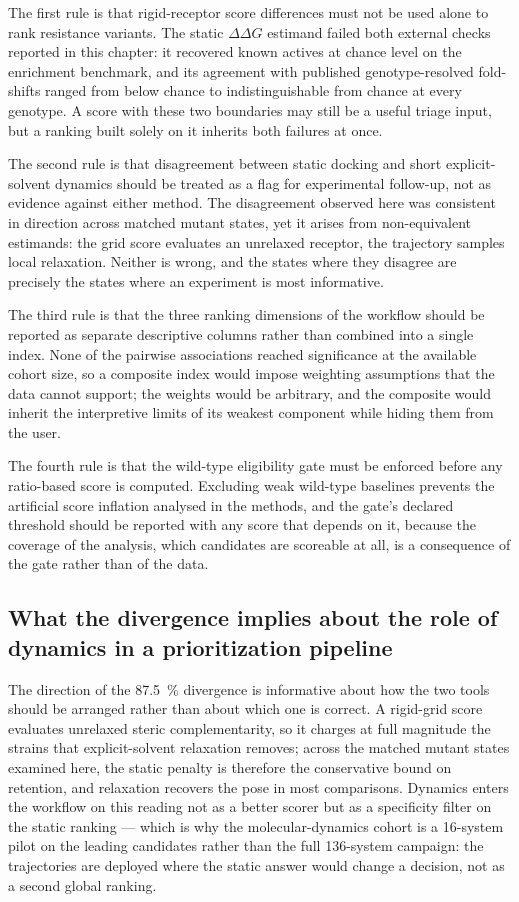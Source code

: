 The first rule is that rigid-receptor score differences must not be used alone to rank resistance variants. The static $\Delta\Delta G$ estimand failed both external checks reported in this chapter: it recovered known actives at chance level on the enrichment benchmark, and its agreement with published genotype-resolved fold-shifts ranged from below chance to indistinguishable from chance at every genotype. A score with these two boundaries may still be a useful triage input, but a ranking built solely on it inherits both failures at once.

The second rule is that disagreement between static docking and short explicit-solvent dynamics should be treated as a flag for experimental follow-up, not as evidence against either method. The disagreement observed here was consistent in direction across matched mutant states, yet it arises from non-equivalent estimands: the grid score evaluates an unrelaxed receptor, the trajectory samples local relaxation. Neither is wrong, and the states where they disagree are precisely the states where an experiment is most informative.

The third rule is that the three ranking dimensions of the workflow should be reported as separate descriptive columns rather than combined into a single index. None of the pairwise associations reached significance at the available cohort size, so a composite index would impose weighting assumptions that the data cannot support; the weights would be arbitrary, and the composite would inherit the interpretive limits of its weakest component while hiding them from the user.

The fourth rule is that the wild-type eligibility gate must be enforced before any ratio-based score is computed. Excluding weak wild-type baselines prevents the artificial score inflation analysed in the methods, and the gate's declared threshold should be reported with any score that depends on it, because the coverage of the analysis, which candidates are scoreable at all, is a consequence of the gate rather than of the data.

\subsection{What the divergence implies about the role of dynamics in a prioritization pipeline}\label{sec:res_dynamics_discussion}

The direction of the \qty{87.5}{\percent} divergence is informative about how the two tools should be arranged rather than about which one is correct. A rigid-grid score evaluates unrelaxed steric complementarity, so it charges at full magnitude the strains that explicit-solvent relaxation removes; across the matched mutant states examined here, the static penalty is therefore the conservative bound on retention, and relaxation recovers the pose in most comparisons. Dynamics enters the workflow on this reading not as a better scorer but as a specificity filter on the static ranking --- which is why the molecular-dynamics cohort is a \num{16}-system pilot on the leading candidates rather than the full \num{136}-system campaign: the trajectories are deployed where the static answer would change a decision, not as a second global ranking.

